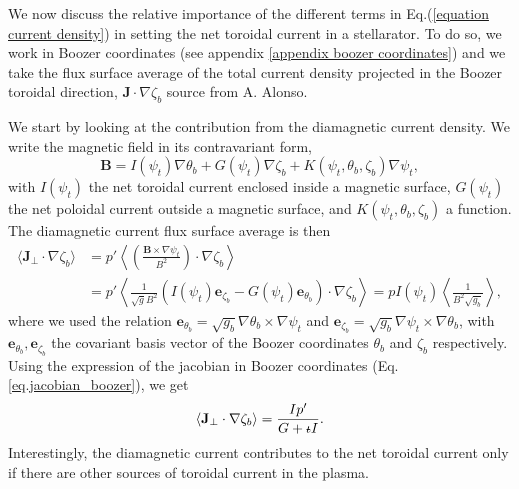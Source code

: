 \documentclass[my_thesis.tex]{subfiles}
\begin{document}
We now discuss the relative importance of the different terms in Eq.(\ref{equation current density}) in setting the net toroidal current in a stellarator. To do so, we work in Boozer coordinates (see appendix \ref{appendix  boozer coordinates}) and we take the flux surface average of the total current density projected in the Boozer toroidal direction, $\mathbf{J}\cdot\nabla\zeta_b$ {\color{red} source from A. Alonso}.

We start by looking at the contribution from the diamagnetic current density. We write the magnetic field in its contravariant form,
\begin{equation}
	\mathbf{B} = I(\psi_t)\nabla\theta_b + G(\psi_t)\nabla\zeta_b + K(\psi_t,\theta_b,\zeta_b)\nabla\psi_t, 
\end{equation}
with $I(\psi_t)$ the net toroidal current enclosed inside a magnetic surface, $G(\psi_t)$ the net poloidal current outside a magnetic surface, and $K(\psi_t,\theta_b,\zeta_b)$ a function. The diamagnetic current flux surface average is then
\begin{align}
	\langle\mathbf{J}_\perp\cdot\nabla\zeta_b\rangle &= p'\left\langle \left(\frac{\mathbf{B}\times\nabla\psi_t}{B^2}\right)\cdot\nabla\zeta_b\right\rangle\\
	&= p'\left\langle \frac{1}{\sqrt{g}B^2}(I(\psi_t) \mathbf{e}_{\zeta_b} - G(\psi_t)\mathbf{e}_{\theta_b})\cdot\nabla\zeta_b\right\rangle = pI(\psi_t)\left\langle \frac{1}{B^2 \sqrt{g_b}} \right\rangle,
\end{align} 
where we used the relation $\mathbf{e}_{\theta_b} = \sqrt{g_b}\nabla\theta_b\times\nabla\psi_t$ and $\mathbf{e}_{\zeta_b} = \sqrt{g_b}\nabla\psi_t\times\nabla\theta_b$, with $\mathbf{e}_{\theta_b},\mathbf{e}_{\zeta_b}$ the covariant basis vector of the Boozer coordinates $\theta_b$ and $\zeta_b$ respectively. Using the expression of the jacobian in Boozer coordinates (Eq.\ref{eq.jacobian_boozer}), we get
\begin{equation}
	\langle\mathbf{J}_\perp\cdot\nabla\zeta_b\rangle = \frac{Ip'}{G+\text{$\iota\!\!$-} I}.
\end{equation}
Interestingly, the diamagnetic current contributes to the net toroidal current only if there are other sources of toroidal current in the plasma.
\end{document}
